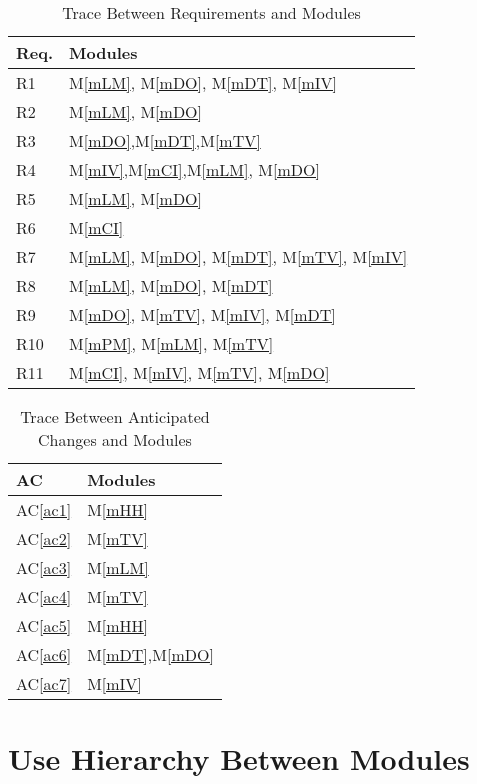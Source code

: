 \documentclass[12pt, titlepage]{article}
\newcommand{\acref}[1]{AC\ref{#1}}
\newcommand{\mref}[1]{M\ref{#1}}
\begin{document}
\begin{table}[H]
\centering
\begin{tabular}{p{} p{}}
\toprule
\textbf{Req.} & \textbf{Modules}\\
\midrule
R1 & \mref{mLM}, \mref{mDO}, \mref{mDT}, \mref{mIV}\\
R2 & \mref{mLM}, \mref{mDO}\\
R3 & \mref{mDO},\mref{mDT},\mref{mTV}\\
R4 & \mref{mIV},\mref{mCI},\mref{mLM}, \mref{mDO}\\
R5 & \mref{mLM}, \mref{mDO}\\
R6 & \mref{mCI}\\
R7 & \mref{mLM}, \mref{mDO}, \mref{mDT}, \mref{mTV}, \mref{mIV}\\
R8 & \mref{mLM}, \mref{mDO}, \mref{mDT}\\
R9 & \mref{mDO}, \mref{mTV}, \mref{mIV}, \mref{mDT}\\
R10 & \mref{mPM}, \mref{mLM}, \mref{mTV}\\
R11 & \mref{mCI}, \mref{mIV}, \mref{mTV}, \mref{mDO}\\
\bottomrule
\end{tabular}
\caption{Trace Between Requirements and Modules}
\label{TblRT}
\end{table}


\begin{table}[H]
\centering
\begin{tabular}{p{} p{}}
\toprule
\textbf{AC} & \textbf{Modules}\\
\midrule
\acref{ac1} & \mref{mHH}\\
\acref{ac2} & \mref{mTV}\\
\acref{ac3} & \mref{mLM}\\
\acref{ac4} & \mref{mTV}\\
\acref{ac5} & \mref{mHH}\\
\acref{ac6} & \mref{mDT},\mref{mDO}\\
\acref{ac7} & \mref{mIV}\\
\bottomrule
\end{tabular}
\caption{Trace Between Anticipated Changes and Modules}
\label{TblACT}
\end{table}


\section{Use Hierarchy Between Modules} \label{SecUse}
\end{document}

